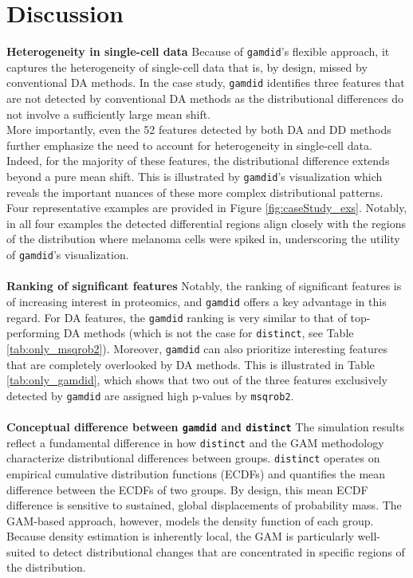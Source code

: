 \section{Discussion} \label{discussion}

\textbf{Heterogeneity in single-cell data}
Because of \texttt{gamdid}'s flexible approach, it captures the heterogeneity of single-cell data that is, by design, missed by conventional DA methods. In the case study, \texttt{gamdid} identifies three features that are not detected by conventional DA methods as the distributional differences do not involve a sufficiently large mean shift.\\
More importantly, even the 52 features detected by both DA and DD methods further emphasize the need to account for heterogeneity in single-cell data. Indeed, for the majority of these features, the distributional difference extends beyond a pure mean shift. This is illustrated by \texttt{gamdid}'s visualization which reveals the important nuances of these more complex distributional patterns.\\
Four representative examples are provided in Figure \ref{fig:caseStudy_exs}. Notably, in all four examples the detected differential regions align closely with the regions of the distribution where melanoma cells were spiked in, underscoring the utility of \texttt{gamdid}'s visualization.
\\
\\
\textbf{Ranking of significant features}
Notably, the ranking of significant features is of increasing interest in proteomics, and \texttt{gamdid} offers a key advantage in this regard. For DA features, the \texttt{gamdid} ranking is very similar to that of top-performing DA methods (which is not the case for \texttt{distinct}, see Table \ref{tab:only_msqrob2}). Moreover, \texttt{gamdid} can also prioritize interesting features that are completely overlooked by DA methods. This is illustrated in Table \ref{tab:only_gamdid}, which shows that two out of the three features exclusively detected by \texttt{gamdid} are assigned high p-values by \texttt{msqrob2}.
\\
\\
\textbf{Conceptual difference between \texttt{gamdid} and \texttt{distinct}}
The simulation results reflect a fundamental difference in how \texttt{distinct} and the GAM methodology characterize distributional differences between groups. \texttt{distinct} operates on empirical cumulative distribution functions (ECDFs) and quantifies the mean difference between the ECDFs of two groups. By design, this mean ECDF difference is sensitive to sustained, global displacements of probability mass. The GAM-based approach, however, models the density function of each group. Because density estimation is inherently local, the GAM is particularly well-suited to detect distributional changes that are concentrated in specific regions of the distribution.\\
